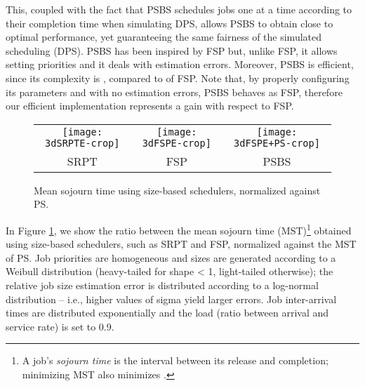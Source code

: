 \documentclass[11pt,oneside,english]{amsart}
\providecommand{\tabularnewline}{\\}
\numberwithin{equation}{section}
\numberwithin{figure}{section}
\theoremstyle{definition}
\theoremstyle{plain}
\begin{document}
This, coupled with the fact that PSBS schedules jobs one at a time 
according to their completion time when simulating DPS, 
allows PSBS to obtain close to optimal performance, yet guaranteeing 
the same fairness of the simulated scheduling (DPS). 
PSBS has been inspired by FSP but, unlike FSP, it allows setting priorities
and it deals with estimation errors. Moreover, PSBS
is efficient, since its complexity is , compared to
 of FSP. Note that, by properly configuring its parameters and 
with no estimation errors, PSBS behaves as FSP, therefore our efficient 
implementation represents a gain with respect to FSP.

\begin{comment}
executes jobs serially according to their completion
order in DPS; the abovementioned problem is solved by changing the
scheduling policy as soon as one or more jobs become ``late'', i.e.,
pending in the real system even if they are already completed in the
simlated case. Due to the dominance result shown in Section \ref{sec:Analytical-Results},
this can only be caused by job size estimation errors; in this case,
resources are shared between late jobs according to the DPS policy.
PSBS allows defining job priorities, and it has an efficient 
implementation.
\end{comment}

\begin{figure}
\begin{centering}
\begin{tabular}{ccc}
\texttt{[image: 3dSRPTE-crop]} & \texttt{[image: 3dFSPE-crop]} & \texttt{[image: 3dFSPE+PS-crop]}\tabularnewline
SRPT & FSP & PSBS\tabularnewline
\end{tabular}
\par\end{centering}

\caption{\label{fig:Mean-sojourn-time}Mean sojourn time using size-based schedulers,
normalized against PS.}
\end{figure}


In Figure \ref{fig:Mean-sojourn-time}, we show the ratio between
the mean sojourn time (MST)\footnote{A job's \emph{sojourn time} is the interval between its release
and completion; minimizing MST also minimizes .} obtained using size-based schedulers, such as SRPT and FSP, 
normalized against the MST
of PS. Job priorities are homogeneous and sizes are generated according
to a Weibull distribution (heavy-tailed for shape < 1, light-tailed
otherwise); the relative job size estimation error is distributed
according to a log-normal distribution -- i.e., higher values of sigma
yield larger errors. Job inter-arrival times are distributed exponentially
and the load (ratio between arrival and service rate) is set
to 0.9.
\end{document}
